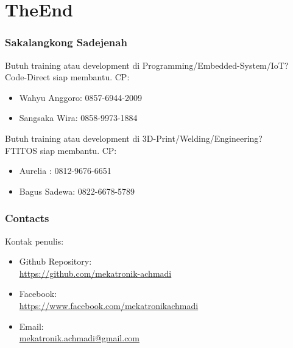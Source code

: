 \documentclass[table,dvipsnames]{beamer}
\begin{document}
	\section{TheEnd}
	\begin{frame}
		\frametitle{Sakalangkong Sadejenah}
		\begin{exampleblock}{}
			Butuh training atau development di Programming/Embedded-System/IoT?\\
			Code-Direct siap membantu. CP:
			\begin{itemize}
				\item Wahyu Anggoro: 0857-6944-2009
				\item Sangsaka Wira: 0858-9973-1884
			\end{itemize}
		\end{exampleblock}

		\begin{exampleblock}{}
			Butuh training atau development di 3D-Print/Welding/Engineering?\\
			FTITOS siap membantu. CP:
			\begin{itemize}
				\item Aurelia     : 0812-9676-6651
				\item Bagus Sadewa: 0822-6678-5789
			\end{itemize}
		\end{exampleblock}
	\end{frame}

	\begin{frame}
		\frametitle{Contacts}
		\begin{exampleblock}{}
			Kontak penulis:
			\begin{itemize}
				\item Github Repository:\\
				\url{https://github.com/mekatronik-achmadi}
				\item Facebook:\\
				\url{https://www.facebook.com/mekatronikachmadi}
				\item Email:\\
				\url{mekatronik.achmadi@gmail.com}
			\end{itemize}
		\end{exampleblock}
	\end{frame}
\end{document}

